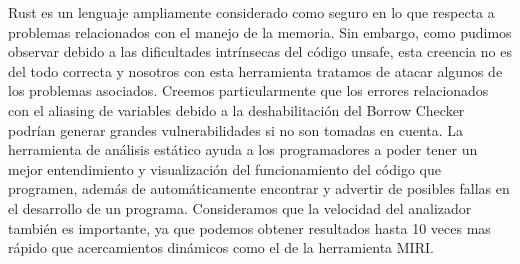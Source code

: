 Rust es un lenguaje ampliamente considerado como seguro en lo que respecta a problemas relacionados con el manejo de la memoria. Sin embargo, como pudimos observar debido a las dificultades intrínsecas del código unsafe, esta creencia no es del todo correcta y nosotros con esta herramienta tratamos de atacar algunos de los problemas asociados. Creemos particularmente que los errores relacionados con el aliasing de variables debido a la deshabilitación del Borrow Checker podrían generar grandes vulnerabilidades si no son tomadas en cuenta. La herramienta de análisis estático ayuda a los programadores a poder tener un mejor entendimiento y visualización del funcionamiento del código que programen, además de automáticamente encontrar y advertir de posibles fallas en el desarrollo de un programa. Consideramos que la velocidad del analizador también es importante, ya que podemos obtener resultados hasta 10 veces mas rápido que acercamientos dinámicos como el de la herramienta MIRI. 



